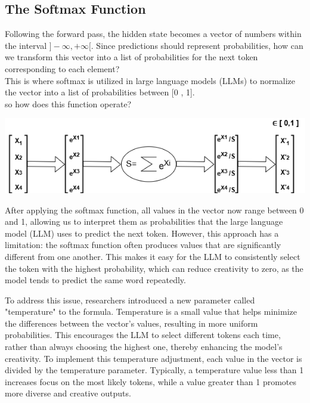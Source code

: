 \documentclass[12pt]{article}
\begin{document}
\newpage
\vspace*{0.2cm}
\subsection{The Softmax Function}

Following the forward pass, the hidden state becomes a vector of numbers within the interval $ ]-\infty, +\infty[ $. Since predictions should represent probabilities, how can we transform this vector into a list of probabilities for the next token corresponding to each element?\\ This is where softmax is utilized in large language models (LLMs) to normalize the vector into a list of probabilities between [0 , 1].\\so how does this function operate?
\begin{center}
    \includegraphics[width=\textwidth]{images/llm11.png}
\end{center}

After applying the softmax function, all values in the vector now range between 0 and 1, allowing us to interpret them as probabilities that the large language model (LLM) uses to predict the next token. However, this approach has a limitation: the softmax function often produces values that are significantly different from one another. This makes it easy for the LLM to consistently select the token with the highest probability, which can reduce creativity to zero, as the model tends to predict the same word repeatedly.

To address this issue, researchers introduced a new parameter called "temperature" to the formula. Temperature is a small value that helps minimize the differences between the vector's values, resulting in more uniform probabilities. This encourages the LLM to select different tokens each time, rather than always choosing the highest one, thereby enhancing the model's creativity. To implement this temperature adjustment, each value in the vector is divided by the temperature parameter. Typically, a temperature value less than 1 increases focus on the most likely tokens, while a value greater than 1 promotes more diverse and creative outputs.\\
\end{document}
